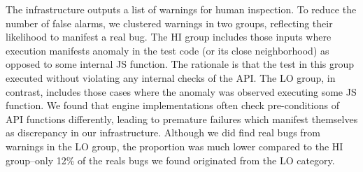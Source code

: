 \documentclass[10pt,conference,anonymous]{IEEEtran}
\begin{document}
The infrastructure outputs a list of warnings for human inspection.
To reduce the number of false alarms, we clustered warnings in two
groups, reflecting their likelihood to manifest a real bug. The HI
group includes those inputs where execution manifests anomaly in the
test code (or its close neighborhood) as opposed to some internal JS
function. The rationale is that the test in this group executed
without violating any internal checks of the API.
The LO group, in contrast, includes those cases where the anomaly
was observed executing some JS function. We found that engine
implementations often check pre-conditions of API functions
differently, leading to premature failures which manifest themselves as
discrepancy in our infrastructure. Although we did find real bugs from
warnings in the LO group, the proportion was much lower compared to the HI
group--only 12\% of the reals bugs we found originated from the LO
category.  
\end{document}
